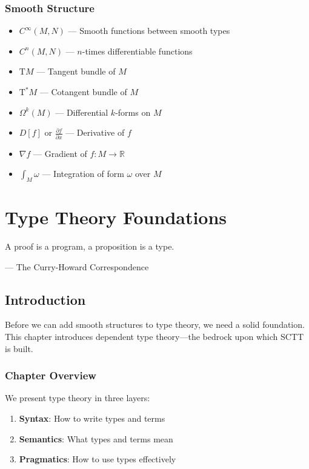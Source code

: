 \documentclass[12pt,openright,twoside]{book}
\theoremstyle{plain}
\theoremstyle{definition}
\theoremstyle{remark}
\newcommand{\R}{\mathbb{R}}
\newcommand{\Cinfty}{C^\infty}
\newcommand{\TM}{\mathrm{T}M}
\newcommand{\TMstar}{\mathrm{T}^*M}
\begin{document}
\subsection{Smooth Structure}
\begin{itemize}
\item $\Cinfty(M,N)$ --- Smooth functions between smooth types
\item $C^n(M,N)$ --- $n$-times differentiable functions
\item $\TM$ --- Tangent bundle of $M$
\item $\TMstar$ --- Cotangent bundle of $M$
\item $\Omega^k(M)$ --- Differential $k$-forms on $M$
\item $D[f]$ or $\frac{\partial f}{\partial x}$ --- Derivative of $f$
\item $\nabla f$ --- Gradient of $f : M \to \R$
\item $\int_M \omega$ --- Integration of form $\omega$ over $M$
\end{itemize}

\chapter{Type Theory Foundations}
\label{ch:type-theory}

\epigraph{A proof is a program, a proposition is a type.}{--- The Curry-Howard Correspondence}

\section{Introduction}

Before we can add smooth structures to type theory, we need a solid foundation. This chapter introduces dependent type theory—the bedrock upon which SCTT is built.

\subsection{Chapter Overview}

We present type theory in three layers:
\begin{enumerate}
\item \textbf{Syntax}: How to write types and terms
\item \textbf{Semantics}: What types and terms mean
\item \textbf{Pragmatics}: How to use types effectively
\end{enumerate}
\end{document}

